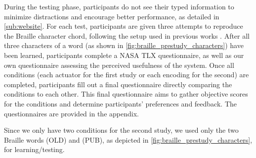During the testing phase, participants do not see their typed information to minimize distractions and encourage better performance, as detailed in \autoref{sub:website}. For each test, participants are given three attempts to reproduce the Braille character chord, following the setup used in previous works \cite{Fang2023, Seim2015, Fang2023a}. After all three characters of a word (as shown in \autoref{fig:braille_prestudy_characters}) have been learned, participants complete a NASA TLX \cite{hart1988development} questionnaire, as well as our own questionnaire assessing the perceived usefulness of the system. Once all conditions (each actuator for the first study or each encoding for the second) are completed, participants fill out a final questionnaire directly comparing the conditions to each other. This final questionnaire aims to gather objective scores for the conditions and determine participants' preferences and feedback. The questionnaires are provided in the appendix.

Since we only have two conditions for the second study, we used only the two Braille words  (OLD) and  (PUB), as depicted in \autoref{fig:braille_prestudy_characters}, for learning/testing.

